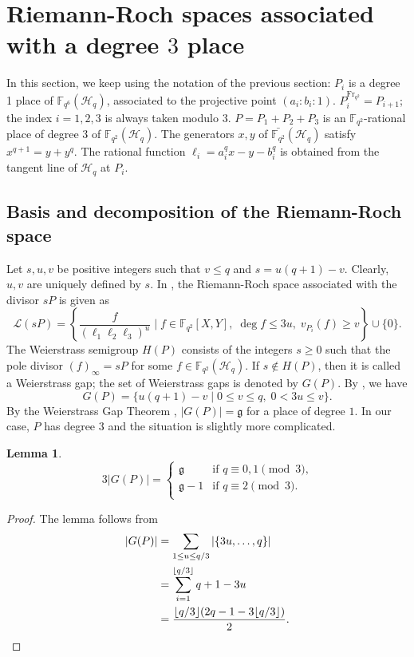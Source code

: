 \documentclass[a4paper]{amsart}
\theoremstyle{plain}
\newtheorem{lemma}[theorem]{Lemma}
\theoremstyle{definition}
\theoremstyle{remark}
\newcommand{\Frob}{{\mathrm{Fr}_{q^2}}}
\newcommand{\g}{\mathfrak{g}}
\begin{document}
\section{Riemann-Roch spaces associated with a degree $3$ place} \label{sec:riemann-roch}
In this section, we keep using the notation of the previous section: $P_i$ is a degree 1 place of $\mathbb{F}_{q^6}(\mathscr{H}_q)$, associated to the projective point $(a_i:b_i:1)$. $P_i^\Frob=P_{i+1}$; the index $i=1,2,3$ is always taken modulo $3$. $P=P_1+P_2+P_3$ is an $\mathbb{F}_{q^2}$-rational place of degree $3$ of $\mathbb{F}_{q^2}(\mathscr{H}_q)$. The generators $x,y$ of $\bar{\mathbb{F}_{q^2}}(\mathscr{H}_q)$ satisfy $x^{q+1}=y+y^q$. The rational function $\ell_i=a_i^qx-y-b_i^q$ is obtained from the tangent line of $\mathscr{H}_q$ at $P_i$. 

\subsection{Basis and decomposition of the Riemann-Roch space}
Let $s,u,v$ be positive integers such that $v\leq q$ and $s=u(q+1)-v$. Clearly, $u,v$ are uniquely defined by $s$. In \cite{korchmaros2013hermitian}, the Riemann-Roch space associated with the divisor $sP$ is given as
\[\mathscr{L}(sP) = \left\{ \frac{f}{(\ell_1\ell_2\ell_3)^u} \mid f \in \mathbb{F}_{q^2}[X,Y], \; \deg f \leq 3u, \; v_{P_i}(f) \geq v \right\} \cup \{0\}.\]
The Weierstrass semigroup $H(P)$ consists of the integers $s\geq 0$ such that the pole divisor $(f)_\infty=sP$ for some $f\in {\mathbb{F}_{q^2}}(\mathscr{H}_q)$. If $s\not\in H(P)$, then it is called a Weierstrass gap; the set of Weierstrass gaps is denoted by $G(P)$. By \cite[Theorem 3.1]{korchmaros2013hermitian}, we have
\[G(P) = \{u(q+1)-v \mid 0\leq v\leq q, \; 0<3u\leq v\}.\]
By the Weierstrass Gap Theorem \cite[Theorem 1.6.8]{stichtenoth2009algebraic}, $|G(P)|=\g$ for a place of degree $1$. In our case, $P$ has degree $3$ and the situation is slightly more complicated.

\begin{lemma} \label{lm:GP-size}
\[3|G(P)| = \begin{cases}
\g & \text{if $q\equiv 0,1 \pmod3$,} \\
\g-1 & \text{if $q\equiv 2 \pmod3$.} \\
\end{cases}\]
\end{lemma}
\begin{proof}
The lemma follows from
\begin{align*}
|G(P)| &= \sum_{1 \leq u \leq q/3} |\{3u,\ldots,q\}| \\
&= \sum_{i=1}^{\lfloor q/3 \rfloor} q+1-3u \\
&= \frac{\lfloor q/3 \rfloor(2q-1-3\lfloor q/3 \rfloor)}{2}. \qedhere
\end{align*}
\end{proof}
\end{document}
